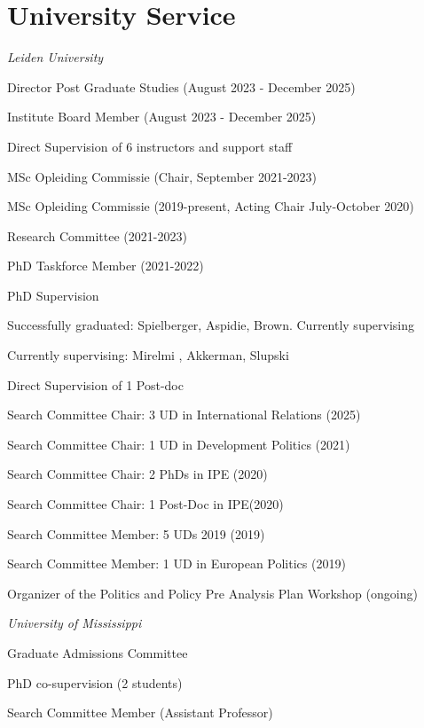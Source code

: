\documentclass[letterpaper]{article}
\renewenvironment{itemize}{
  \begin{list}{}{
    \setlength{\leftmargin}{1.75em}
  }
}{
  \end{list}
}
\begin{document}
\section*{University Service}
\emph{Leiden University}
\begin{itemize}
	\item Director Post Graduate Studies (August 2023 - December 2025)
	\item Institute Board Member (August 2023 - December 2025)
	\item Direct Supervision of 6 instructors and support staff
	\item MSc Opleiding Commissie (Chair, September 2021-2023)
	\item MSc Opleiding Commissie (2019-present, Acting Chair July-October 2020)
	\item Research Committee (2021-2023)
	\item PhD Taskforce Member (2021-2022)
	\item PhD Supervision 
    \begin{itemize}
        \item  Successfully graduated:  Spielberger, Aspidie, Brown. Currently supervising
        \item  Currently supervising: Mirelmi , Akkerman, Slupski
    \end{itemize}
	\item Direct Supervision of 1 Post-doc
	\item Search Committee Chair: 3 UD in International Relations (2025)
    \item Search Committee Chair: 1 UD in Development Politics (2021)
	\item Search Committee Chair: 2 PhDs in IPE (2020)
	\item Search Committee Chair: 1 Post-Doc in IPE(2020)
	\item Search Committee Member: 5 UDs 2019 (2019)
	\item Search Committee Member: 1 UD in European Politics  (2019)
	\item Organizer of the Politics and Policy Pre Analysis Plan Workshop (ongoing)
\end{itemize}
\emph{University of Mississippi}
\begin{itemize}
	\item Graduate Admissions Committee
	\item PhD co-supervision (2 students)
	\item Search Committee Member (Assistant Professor)
\end{itemize}
\end{document}
